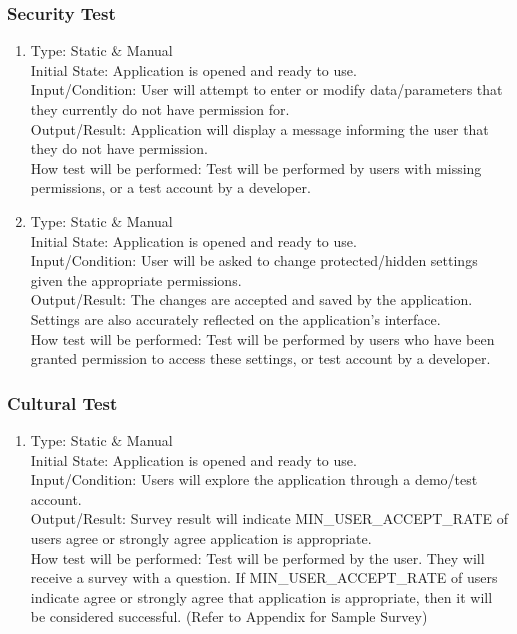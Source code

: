 \documentclass[12pt, titlepage]{article}
\begin{document}
\subsubsection{Security Test}

\begin{adjustwidth}{2.2em}{0pt}
\begin{enumerate}[{NF-ST}1.]
    \item Type: Static \& Manual\\
    Initial State: Application is opened and ready to use.\\
    Input/Condition: User will attempt to enter or modify data/parameters that they currently do not have permission for.\\
    Output/Result: Application will display a message informing the user that they do not have permission.\\
    How test will be performed: Test will be performed by users with missing permissions, or a test account by a developer.
    
    \item Type: Static \& Manual\\
    Initial State: Application is opened and ready to use.\\
    Input/Condition: User will be asked to change protected/hidden settings given the appropriate permissions.\\
    Output/Result: The changes are accepted and saved by the application. Settings are also accurately reflected on the application's interface.\\
    How test will be performed: Test will be performed by users who have been granted permission to access these settings, or test account by a developer.
\end{enumerate}
\end{adjustwidth}

\subsubsection{Cultural Test}

\begin{adjustwidth}{2.2em}{0pt}
\begin{enumerate}[{NF-CT}1.]
    \item Type: Static \& Manual\\
    Initial State: Application is opened and ready to use.\\
    Input/Condition: Users will explore the application through a demo/test account. \\
    Output/Result: Survey result will indicate MIN\_USER\_ACCEPT\_RATE of users agree or strongly agree application is appropriate.\\
    How test will be performed: Test will be performed by the user. They will receive a survey with a question. If MIN\_USER\_ACCEPT\_RATE of users indicate agree or strongly agree that application is appropriate, then it will be considered successful. (Refer to Appendix for Sample Survey)
\end{enumerate}
\end{adjustwidth}
\end{document}
